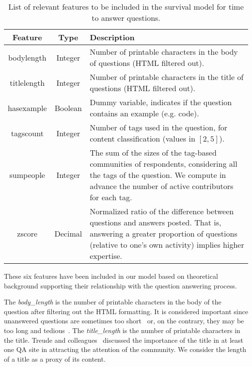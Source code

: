 \documentclass{chi2012}
\newcommand\tabhead[1]{\small\textbf{#1}}
\begin{document}
\begin{table}[h!]
  \centering
  \begin{tabular}{|c|c|l|}
    \hline
    \tabhead{Feature} &
    \multicolumn{1}{|p{0.2\columnwidth}|}{\centering\tabhead{Type}} &
    \multicolumn{1}{|p{0.4\columnwidth}|}{\centering\tabhead{Description}} \\
    \hline
    bodylength & Integer & \multicolumn{1}{|p{0.4\columnwidth}|}{Number of
    printable characters in the body of questions (HTML filtered out).}\\
    \hline
    titlelength & Integer & \multicolumn{1}{|p{0.4\columnwidth}|}{Number of
    printable characters in the title of questions (HTML filtered out).}\\
    \hline
    hasexample & Boolean & \multicolumn{1}{|p{0.4\columnwidth}|}{Dummy variable, 
    indicates if the question contains an example (e.g. code).}\\
    \hline
    tagscount & Integer & \multicolumn{1}{|p{0.4\columnwidth}|}{Number of tags used 
    in the question, for content classification (values in $[2,5]$).}\\
    \hline
    sumpeople & Integer & \multicolumn{1}{|p{0.4\columnwidth}|}{The sum of the
    sizes of the tag-based communities of respondents, considering all the tags of the
    question. We compute in advance the number of active contributors for each tag.}\\
    \hline
    zscore & Decimal & \multicolumn{1}{|p{0.4\columnwidth}|}{Normalized ratio 
    of the difference between questions and answers posted. That is, answering a greater
    proportion of questions (relative to one’s own activity) implies higher expertise.}\\
    \hline
  \end{tabular}
  \caption{List of relevant features to be included in the survival model for
  time to answer questions.}
  \label{tab:features-list}
\end{table}

These six features have been included in our model based on theoretical
background supporting their relationship with the question answering process.

The \textit{body\_length} is the number of printable characters in the body of the 
question after filtering out the HTML formatting. It is considered important 
since unanswered questions are sometimes too short~\cite{treude2011} or, on 
the contrary, they may be too long and tedious~\cite{mamykina2011}. The 
\textit{title\_length} is the number of printable characters in the title. Treude 
and colleagues~\cite{treude2011} discussed the importance of the title 
in at least one QA site in attracting the attention of the community. We 
consider the length of a title as a proxy of its content.
\end{document}
